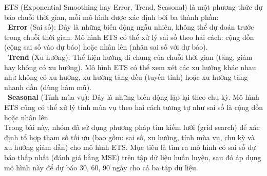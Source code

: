ETS (Exponential Smoothing hay Error, Trend, Seasonal) là một phương thức dự báo chuỗi thời gian, mỗi mô hình được xác định bởi ba thành phần:\\
\indent\textbullet\ \textbf{Error} (Sai số): Đây là những biến động ngẫu nhiên, không thể dự đoán trước trong chuỗi thời gian. Mô hình ETS có thể xử lý sai số theo hai cách: cộng dồn (cộng sai số vào dự báo) hoặc nhân lên (nhân sai số với dự báo).\\
\indent\textbullet\ \textbf{Trend} (Xu hướng): Thể hiện hướng đi chung của chuỗi thời gian (tăng, giảm hay không có xu hướng). Mô hình ETS có thể xem xét các xu hướng khác nhau như không có xu hướng, xu hướng tăng đều (tuyến tính) hoặc xu hướng tăng nhanh dần (dùng hàm mũ).\\
\indent\textbullet\ \textbf{Seasonal} (Tính mùa vụ): Đây là những biến động lặp lại theo chu kỳ. Mô hình ETS cũng có thể xử lý tính mùa vụ theo hai cách tương tự như sai số là cộng dồn hoặc nhân lên. \\
Trong bài này, nhóm đã sử dụng phương pháp tìm kiếm lưới (grid search) để xác định tổ hợp tham số tối ưu (bao gồm: sai số, xu hướng, tính mùa vụ, chu kỳ và xu hướng giảm dần) cho mô hình ETS. Mục tiêu là tìm ra mô hình có sai số dự báo thấp nhất (đánh giá bằng MSE) trên tập dữ liệu huấn luyện, sau đó áp dụng mô hình này để dự báo 30, 60, 90 ngày cho cả ba tập dữ liệu. 
